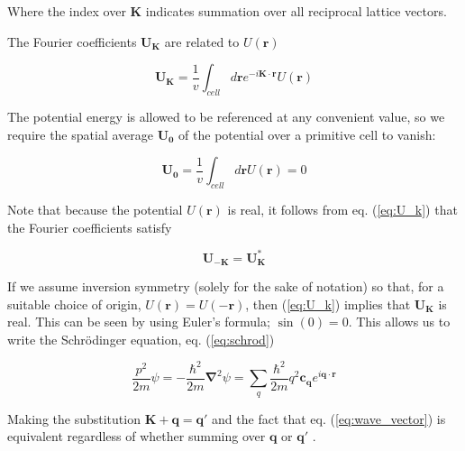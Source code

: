 	Where the index over $\mathbf{K}$ indicates summation over all reciprocal lattice vectors.

	The Fourier coefficients $\mathbf{U_K}$ are related to $U(\mathbf{r})$ 

	\begin{equation} \label{eq:U_k}
		\mathbf{U_K}
		=
		\frac{1}{v}
		\int_{cell}
		d \mathbf{r}
		e^{-i \mathbf{K} \cdot \mathbf{r}}
		U(\mathbf{r})
	\end{equation}

	The potential energy is allowed to be referenced at any convenient value, so we require the spatial average $\mathbf{U_0}$ of the potential over a primitive cell to vanish:

	\begin{equation} \label{eq:U_0}
		\mathbf{U_0}
		=
		\frac{1}{v}
		\int_{cell}
		d \mathbf{r}
		U(\mathbf{r})
		= 0
	\end{equation}

	Note that because the potential $U(\mathbf{r})$ is real, it follows from eq. (\ref{eq:U_k}) that the Fourier coefficients satisfy

	\begin{equation} \label{eq:U_conj}
		\mathbf{U_{-K}} = \mathbf{U_{K}^*}
	\end{equation}

	If we assume inversion symmetry (solely for the sake of notation)  
	so that, for a suitable choice of origin, $U(\mathbf{r}) = U(-\mathbf{r})$, then (\ref{eq:U_k}) implies that $\mathbf{U_K}$ is real. This can be seen by using Euler's formula; $\sin(0) = 0$. This allows us to write  the Schrödinger equation, eq. (\ref{eq:schrod}) 

	\begin{equation} \label{eq:hamiltonian}
		\frac{p^2}{2m} \psi
		=
		-\frac{\hbar^2}{2m}
		\boldsymbol{\nabla}^2 \psi
		=
		\sum_{q} \frac{\hbar^2}{2m}
		q^2 \mathbf{c_q} 
		e^{i\mathbf{q} \cdot \mathbf{r}}
	\end{equation}

	Making the substitution $\mathbf{K+q=q'}$ and the fact that eq. (\ref{eq:wave_vector}) is equivalent regardless of whether summing over $\mathbf{q}$ or $\mathbf{q'}$ .

